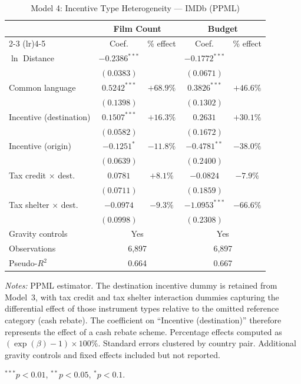 \clearpage


\begin{table}[htbp]
\centering
\caption{Model 4: Incentive Type Heterogeneity --- IMDb (PPML)}
\label{tab:model4}
\small
\begin{tabular}{l cc cc}
\toprule
 & \multicolumn{2}{c}{Film Count} & \multicolumn{2}{c}{Budget} \\
\cmidrule(lr){2-3} \cmidrule(lr){4-5}
 & Coef. & \% effect & Coef. & \% effect \\
\midrule
$\ln$ Distance & $-0.2386^{***}$ & & $-0.1772^{***}$ & \\
 & $(0.0383)$ & & $(0.0671)$ & \\[4pt]
Common language & $0.5242^{***}$ & $+68.9\%$ & $0.3826^{***}$ & $+46.6\%$ \\
 & $(0.1398)$ & & $(0.1302)$ & \\[4pt]
Incentive (destination) & $0.1507^{***}$ & $+16.3\%$ & $0.2631$ & $+30.1\%$ \\
 & $(0.0582)$ & & $(0.1672)$ & \\[4pt]
Incentive (origin) & $-0.1251^{*}$ & $-11.8\%$ & $-0.4781^{**}$ & $-38.0\%$ \\
 & $(0.0639)$ & & $(0.2400)$ & \\[4pt]
Tax credit $\times$ dest. & $0.0781$ & $+8.1\%$ & $-0.0824$ & $-7.9\%$ \\
 & $(0.0711)$ & & $(0.1859)$ & \\[4pt]
Tax shelter $\times$ dest. & $-0.0974$ & $-9.3\%$ & $-1.0953^{***}$ & $-66.6\%$ \\
 & $(0.0998)$ & & $(0.2308)$ & \\[4pt]
\midrule
Gravity controls & \multicolumn{2}{c}{Yes} & \multicolumn{2}{c}{Yes} \\
Observations & \multicolumn{2}{c}{6,897} & \multicolumn{2}{c}{6,897} \\
Pseudo-$R^2$ & \multicolumn{2}{c}{0.664} & \multicolumn{2}{c}{0.667} \\
\bottomrule
\end{tabular}
\par\vspace{4pt}\noindent\begin{minipage}{\textwidth}
\footnotesize
\par \textit{Notes:} PPML estimator. The destination incentive dummy is retained from Model~3, with tax credit and tax shelter interaction dummies capturing the differential effect of those instrument types relative to the omitted reference category (cash rebate). The coefficient on ``Incentive (destination)'' therefore represents the effect of a cash rebate scheme. Percentage effects computed as $(\exp(\beta)-1) \times 100\%$. Standard errors clustered by country pair. Additional gravity controls and fixed effects included but not reported.
\par $^{***}p<0.01$, $^{**}p<0.05$, $^{*}p<0.1$.
\end{minipage}
\end{table}


